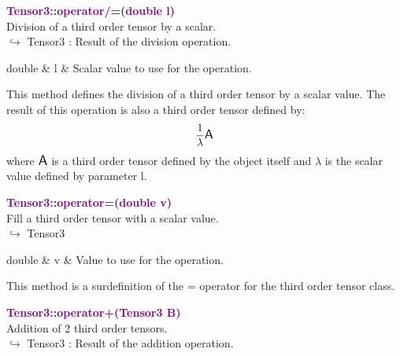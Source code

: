 \textcolor{purple}{\textbf{Tensor3::operator/=(double l)}}\label{Tensor3::operator/=(double l)}\\
Division of a third order tensor by a scalar.\\ \hspace*{10mm}$\hookrightarrow$ Tensor3 : Result of the division operation.

\begin{tcolorbox}[width=\textwidth,myArgs,tabularx={ll|R}]
double & l & Scalar value to use for the operation.
\end{tcolorbox}

This method defines the division of a third order tensor by a scalar value.
The result of this operation is also a third order tensor defined by:
\begin{equation*}
\frac{1}{\lambda} \mbox{\large\ensuremath{\mathsf{A}}}
\end{equation*}
where $\mbox{\large\ensuremath{\mathsf{A}}}$ is a third order tensor defined by the object itself and $\lambda$ is the scalar value defined by parameter l.

\textcolor{purple}{\textbf{Tensor3::operator=(double v)}}\label{Tensor3::operator=(double v)}\\
Fill a third order tensor with a scalar value.\\ \hspace*{10mm}$\hookrightarrow$ Tensor3

\begin{tcolorbox}[width=\textwidth,myArgs,tabularx={ll|R}]
double & v & Value to use for the operation.
\end{tcolorbox}

This method is a surdefinition of the = operator for the third order tensor class.

\textcolor{purple}{\textbf{Tensor3::operator+(Tensor3 B)}}\label{Tensor3::operator+(Tensor3 B)}\\
Addition of 2 third order tensors.\\ \hspace*{10mm}$\hookrightarrow$ Tensor3 : Result of the addition operation.

